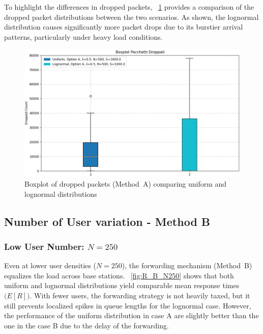 \documentclass{report}
\begin{document}
\begin{flushleft}
To highlight the differences in dropped packets, \figurename~\ref{fig:Dropped_Boxplot} provides a comparison of the dropped packet distributions between the two scenarios. As shown, the lognormal distribution causes significantly more packet drops due to its burstier arrival patterns, particularly under heavy load conditions.
\end{flushleft}

\begin{figure}[H]
    \centering
    \includegraphics[width=\textwidth]{img/plots/N-vary/Dropped-boxplot.png}
    \caption{Boxplot of dropped packets (Method~A) comparing uniform and lognormal distributions}
    \label{fig:Dropped_Boxplot}
\end{figure}


\subsection*{Number of User variation - Method B}

\subsubsection{\textbf{Low User Number: \(N = 250\)}}

Even at lower user densities (\(N = 250\)), the forwarding mechanism (Method~B) equalizes the load across base stations. \figurename~\ref{fig:R_B_N250} shows that both uniform and lognormal distributions yield comparable mean response times \(\bigl(E[R]\bigr)\). With fewer users, the forwarding strategy is not heavily taxed, but it still prevents localized spikes in queue lengths for the lognormal case. However, the performance of the uniform distribution in case A are slightly better than the one in the case B due to the delay of the forwarding.
\end{document}
